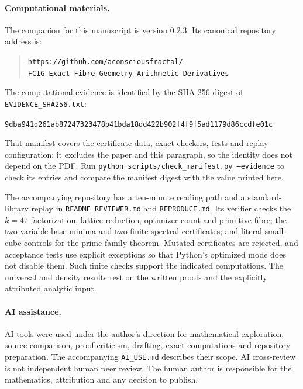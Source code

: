 \documentclass[11pt,a4paper]{article}
\theoremstyle{definition}\newtheorem{question}[theorem]{Question}
\theoremstyle{remark}\newtheorem{remark}[theorem]{Remark}
\begin{document}
\paragraph{Computational materials.}
The companion for this manuscript is version 0.2.3. Its canonical
repository address is:
\begin{quote}\small\noindent
\href{https://github.com/aconsciousfractal/FCIG-Exact-Fibre-Geometry-Arithmetic-Derivatives}{%
\texttt{https://github.com/aconsciousfractal/}\\
\texttt{FCIG-Exact-Fibre-Geometry-Arithmetic-Derivatives}}
\end{quote}
The computational evidence is identified by the SHA-256 digest of
\texttt{EVIDENCE\_SHA256.txt}:
\begin{center}\small\texttt{9dba941d261ab87247323478b41bda18dd422b902f4f9f5ad1179d86ccdfe01c}\end{center}
That manifest covers the certificate data, exact checkers, tests and replay
configuration; it excludes the paper and this paragraph, so the identity
does not depend on the PDF. Run
\texttt{python scripts/check\_manifest.py --evidence} to check its entries
and compare the manifest digest with the value printed here.

The accompanying repository has a ten-minute reading path and a
standard-library replay in \texttt{README\_REVIEWER.md} and
\texttt{REPRODUCE.md}. Its verifier checks the $k=47$ factorization,
lattice reduction, optimizer count and primitive fibre; the two
variable-base minima and two finite spectral certificates; and literal
small-cube controls for the prime-family theorem. Mutated certificates
are rejected, and acceptance tests use explicit exceptions so that
Python's optimized mode does not disable them. Such finite checks
support the indicated computations. The universal and density results
rest on the written proofs and the explicitly attributed analytic input.

\paragraph{AI assistance.}
AI tools were used under the author's direction for mathematical
exploration, source comparison, proof criticism, drafting, exact
computations and repository preparation. The accompanying
\texttt{AI\_USE.md} describes their scope. AI cross-review is not
independent human peer review. The human author is responsible for
the mathematics, attribution and any decision to publish.
\end{document}
